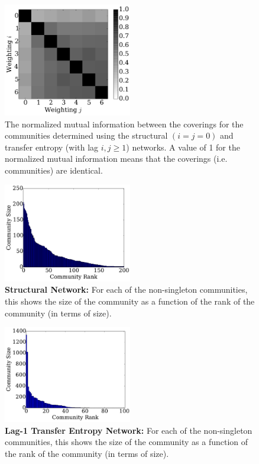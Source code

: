 \documentclass[]{article}
\title{}
\author{  }
\date{}
\begin{document}
\ifpdf
{}
\else
{}
\fi

\maketitle

\begin{figure}[h!]
  \centering
\includegraphics[width=0.50\textwidth]{Figures/nmi_singletons.pdf}
\caption{The normalized mutual information between the coverings for the communities determined using the structural $(i = j = 0)$ and transfer entropy (with lag $i, j \geq 1$) networks. A value of 1 for the normalized mutual information means that the coverings (i.e. communities) are identical.}
\label{Fig-}
\end{figure}

\begin{figure}[h!]
  \centering
\includegraphics[width=0.50\textwidth]{Figures/comm-oslom0.pdf}
\caption{\textbf{Structural Network:} For each of the non-singleton communities, this shows the size of the community as a function of the rank of the community (in terms of size).}
\label{Fig-}
\end{figure}

\begin{figure}[h!]
  \centering
\includegraphics[width=0.50\textwidth]{Figures/comm-oslom1.pdf}
\caption{\textbf{Lag-1 Transfer Entropy Network:} For each of the non-singleton communities, this shows the size of the community as a function of the rank of the community (in terms of size).}
\label{Fig-}
\end{figure}
\end{document}
